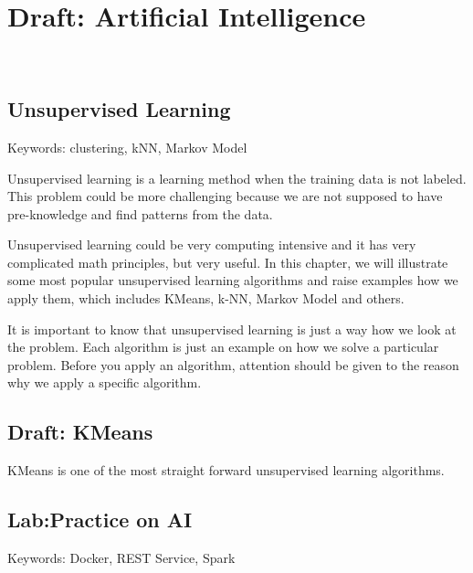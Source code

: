\chapter{Draft: Artificial Intelligence}
\label{c:ai}

\FILENAME\

%
%

\section{Unsupervised Learning}

Keywords: clustering, kNN, Markov Model

Unsupervised learning is a learning method when the training data 
is not labeled. This problem could be more challenging because we
are not supposed to have pre-knowledge and find patterns from the
data. 

Unsupervised learning could be very computing intensive and it has 
very complicated math principles, but very useful. In this chapter, we will 
illustrate some most popular unsupervised learning algorithms and 
raise examples how we apply them, which includes KMeans, k-NN, 
Markov Model and others. 

It is important to know that unsupervised learning is just a way how 
we look at the problem. Each algorithm is just an example on how we
solve a particular problem. Before you apply an algorithm, attention should
be given to the reason why we apply a specific algorithm.

\section{Draft: KMeans}
KMeans is one of the most straight forward unsupervised learning 
algorithms.







\section{Lab:Practice on AI}
Keywords: Docker, REST Service, Spark

